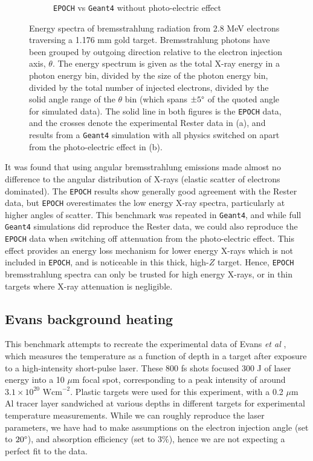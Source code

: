 \documentclass[12pt]{article}
\numberwithin{equation}{section}
\begin{document}
\begin{figure}
\begin{subfigure}{.49\textwidth}
  \caption{\texttt{EPOCH} vs \texttt{Geant4} without photo-electric effect}
\end{subfigure}
\caption{Energy spectra of bremsstrahlung radiation from 2.8 MeV electrons traversing a 1.176 mm gold target. Bremsstrahlung photons have been grouped by outgoing direction relative to the electron injection axis, $\theta$. The energy spectrum is given as the total X-ray energy in a photon energy bin, divided by the size of the photon energy bin, divided by the total number of injected electrons, divided by the solid angle range of the $\theta$ bin (which spans $\pm 5 \degree$ of the quoted angle for simulated data). The solid line in both figures is the \texttt{EPOCH} data, and the crosses denote the experimental Rester data in (a), and results from a \texttt{Geant4} simulation with all physics switched on apart from the photo-electric effect in (b).}
\label{fig:bench:rester}
\end{figure}

It was found that using angular bremsstrahlung emissions made almost no difference to the angular distribution of X-rays (elastic scatter of electrons dominated). The \texttt{EPOCH} results show generally good agreement with the Rester data, but \texttt{EPOCH} overestimates the low energy X-ray spectra, particularly at higher angles of scatter. This benchmark was repeated in \texttt{Geant4}, and while full \texttt{Geant4} simulations did reproduce the Rester data, we could also reproduce the \texttt{EPOCH} data when switching off attenuation from the photo-electric effect. This effect provides an energy loss mechanism for lower energy X-rays which is not included in \texttt{EPOCH}, and is noticeable in this thick, high-$Z$ target. Hence, \texttt{EPOCH} bremsstrahlung spectra can only be trusted for high energy X-rays, or in thin targets where X-ray attenuation is negligible.

\subsection{Evans background heating} \label{sec:bench:Evans}

This benchmark attempts to recreate the experimental data of Evans \textit{et al} \cite{benchmark:Evans}, which measures the temperature as a function of depth in a target after exposure to a high-intensity short-pulse laser. These 800 fs shots focused 300 J of laser energy into a 10 $\mu$m focal spot, corresponding to a peak intensity of around $3.1\times 10^{20}\text{ Wcm}^{-2}$. Plastic targets were used for this experiment, with a 0.2 $\mu$m Al tracer layer sandwiched at various depths in different targets for experimental temperature measurements. While we can roughly reproduce the laser parameters, we have had to make assumptions on the electron injection angle (set to $20\degree$), and absorption efficiency (set to $3 \%$), hence we are not expecting a perfect fit to the data.
\end{document}
